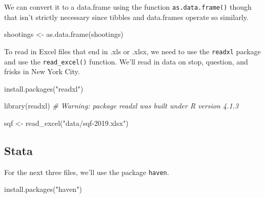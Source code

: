 \documentclass[
  a4paper,
]{krantz}
\makeatletter
\newenvironment{Shaded}{\begin{snugshade}}{\end{snugshade}}
\newcommand{\CommentTok}[1]{\textcolor[rgb]{0.56,0.35,0.01}{\textit{#1}}}
\newcommand{\FunctionTok}[1]{\textcolor[rgb]{0.00,0.00,0.00}{#1}}
\newcommand{\NormalTok}[1]{#1}
\newcommand{\OtherTok}[1]{\textcolor[rgb]{0.56,0.35,0.01}{#1}}
\newcommand{\StringTok}[1]{\textcolor[rgb]{0.31,0.60,0.02}{#1}}
\newenvironment{kframe}{%
\medskip{}
\setlength{\fboxsep}{.8em}
 \def\at@end@of@kframe{}%
 \ifinner\ifhmode%
  \def\at@end@of@kframe{\end{minipage}}%
  \begin{minipage}{\columnwidth}%
 \fi\fi%
 \def\FrameCommand##1{\hskip\@totalleftmargin \hskip-\fboxsep
 \colorbox{shadecolor}{##1}\hskip-\fboxsep
     \hskip-\linewidth \hskip-\@totalleftmargin \hskip\columnwidth}%
 \MakeFramed {\advance\hsize-\width
   \@totalleftmargin\z@ \linewidth\hsize
   \@setminipage}}%
 {\par\unskip\endMakeFramed%
 \at@end@of@kframe}
\renewenvironment{Shaded}{\begin{kframe}}{\end{kframe}}
\makeatother
\begin{document}
We can convert it to a data.frame using the function
\texttt{as.data.frame()} though that isn't strictly
necessary since tibbles and data.frames operate so
similarly.

\begin{Shaded}
\begin{Highlighting}[]
\NormalTok{shootings }\OtherTok{\textless{}{-}} \FunctionTok{as.data.frame}\NormalTok{(shootings)}
\end{Highlighting}
\end{Shaded}

To read in Excel files that end in .xls or .xlsx, we need to
use the \texttt{readxl} package and use the
\texttt{read\_excel()} function. We'll read in data on stop,
question, and frisks in New York City.

\begin{Shaded}
\begin{Highlighting}[]
\FunctionTok{install.packages}\NormalTok{(}\StringTok{"readxl"}\NormalTok{)}
\end{Highlighting}
\end{Shaded}

\begin{Shaded}
\begin{Highlighting}[]
\FunctionTok{library}\NormalTok{(readxl)}
\CommentTok{\# Warning: package \textquotesingle{}readxl\textquotesingle{} was built under R version 4.1.3}
\end{Highlighting}
\end{Shaded}

\begin{Shaded}
\begin{Highlighting}[]
\NormalTok{sqf }\OtherTok{\textless{}{-}} \FunctionTok{read\_excel}\NormalTok{(}\StringTok{"data/sqf{-}2019.xlsx"}\NormalTok{)}
\end{Highlighting}
\end{Shaded}

\hypertarget{stata}{%
\subsection{Stata}\label{stata}}

For the next three files, we'll use the package
\texttt{haven}.

\begin{Shaded}
\begin{Highlighting}[]
\FunctionTok{install.packages}\NormalTok{(}\StringTok{"haven"}\NormalTok{)}
\end{Highlighting}
\end{Shaded}
\end{document}
